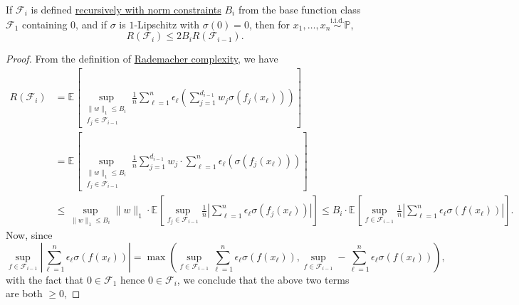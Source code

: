 \begin{lemma}\label{lma:recursive}
	If \(\mathscr{F} _i\) is defined \hyperref[def:norm-recursive]{recursively with norm constraints} \(B_i\) from the base function class \(\mathscr{F} _1\) containing \(0\), and if \(\sigma \) is \(1\)-Lipschitz with \(\sigma (0) = 0\), then for \(x_1, \dots , x_n \overset{\text{i.i.d.}}{\sim } \mathbb{P} \),
	\[
		R(\mathscr{F} _i) \leq 2 B_i R(\mathscr{F} _{i-1}) .
	\]
\end{lemma}
\begin{proof}
	From the definition of \hyperref[def:Rademacher-complexity]{Rademacher complexity}, we have
	\[
		\begin{split}
			R(\mathscr{F} _i)
			 & = \mathbb{E}_{}\left[\sup _{\substack{\lVert w \rVert _1 \leq B_i                                                                                                                                                                  \\ f_j \in \mathscr{F} _{i-1}}} \frac{1}{n} \sum_{\ell = 1}^{n} \epsilon _{\ell } \left( \sum_{j=1}^{d_{i-1}} w_j \sigma (f_j(x_{\ell })) \right)  \right] \\
			 & = \mathbb{E}_{}\left[\sup _{\substack{\lVert w \rVert _1 \leq B_i                                                                                                                                                                  \\ f_j \in \mathscr{F} _{i-1}}} \frac{1}{n} \sum_{j=1}^{d_{i-1}} w_j \cdot \sum_{\ell = 1}^{n} \epsilon _{\ell } \left(\sigma (f_j(x_{\ell })) \right)  \right]\\
			 & \leq \sup _{\lVert w \rVert _1 \leq B_i} \lVert w \rVert _1 \cdot \mathbb{E}_{}\left[ \sup _{f_j \in \mathscr{F} _{i-1}} \frac{1}{n} \left\vert \sum_{\ell = 1}^{n} \epsilon _{\ell } \sigma (f_j(x_{\ell })) \right\vert  \right]
			\leq B_i \cdot \mathbb{E}_{}\left[ \sup _{f\in \mathscr{F} _{i-1}} \frac{1}{n} \left\vert \sum_{\ell = 1}^{n} \epsilon _{\ell } \sigma (f(x_{\ell })) \right\vert \right].
		\end{split}
	\]
	Now, since
	\[
		\sup _{f\in \mathscr{F} _{i-1}} \left\vert \sum_{\ell = 1}^{n} \epsilon _{\ell } \sigma (f(x_{\ell })) \right\vert
		= \max \left( \sup _{f\in \mathscr{F} _{i-1}} \sum_{\ell = 1}^{n} \epsilon _{\ell } \sigma (f(x_{\ell })), \sup _{f\in \mathscr{F} _{i-1}} - \sum_{\ell = 1}^{n} \epsilon _{\ell } \sigma (f(x_{\ell })) \right),
	\]
	with the fact that \(0\in \mathscr{F} _1\) hence \(0\in \mathscr{F} _i\), we conclude that the above two terms are both \(\geq 0\),

\end{proof}
